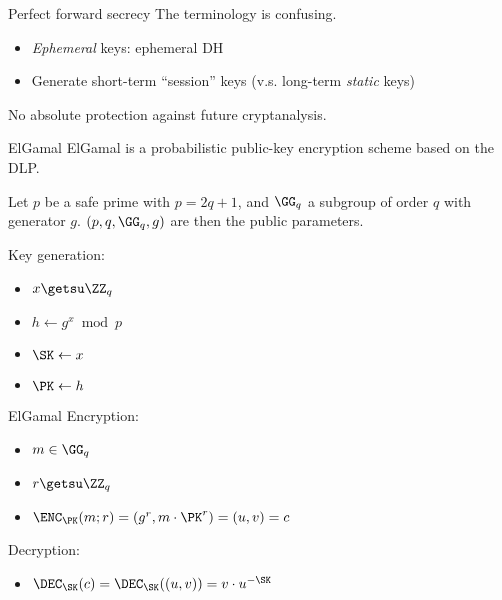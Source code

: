 \begin{frame}{Perfect forward secrecy}
  The terminology is confusing.

  \begin{itemize}
  \item \emph{Ephemeral} keys: ephemeral DH
  \item Generate short-term \enquote{session} keys (v.s. long-term \emph{static} keys)
  \end{itemize}

  \pause
  No absolute protection against future cryptanalysis.
\end{frame}
\fi

\begin{frame}{ElGamal}
  ElGamal is a probabilistic public-key encryption scheme based on the DLP.

  \pause
  Let $p$ be a safe prime with $p = 2q + 1$, and $\GG_q$ a subgroup of order $q$ with generator $g$. 
  $(p, q, \GG_q, g)$ are then the public parameters.

  \pause
  Key generation:
  \begin{itemize}[<+(1)->]
    \item $x \getsu \ZZ_q$
    \item $h \gets g^x \bmod{p}$
    \item $\SK \gets x$
    \item $\PK \gets h$
  \end{itemize}
\end{frame}

\begin{frame}{ElGamal}
  Encryption:
  \begin{itemize}[<+(1)->]
    \item $m\in\GG_q$
    \item $r\getsu\ZZ_q$
    \item $\ENC_\PK(m; r) = (g^r, m\cdot \PK^r) = (u, v) = c$
  \end{itemize}

  \vspace*{2em}

  \pause
  Decryption:
  \begin{itemize}
    \item $\DEC_\SK(c) = \DEC_\SK((u, v)) = v \cdot u^{-\SK}$
  \end{itemize}
\end{frame}

